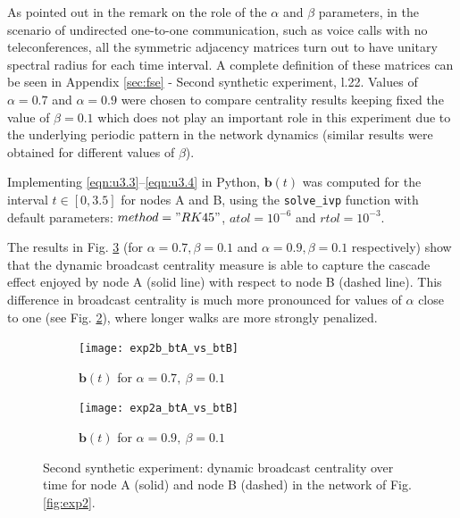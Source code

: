 As pointed out in the remark on the role of the $\alpha$ and $\beta$ parameters, in the scenario of undirected one-to-one communication, such as voice calls with no teleconferences, all the symmetric adjacency matrices turn out to have unitary spectral radius for each time interval. A complete definition of these matrices can be seen in Appendix \ref{sec:fse} - Second synthetic experiment, l.22. Values of $\alpha=0.7$ and $\alpha=0.9$ were chosen to compare centrality results keeping fixed the value of $\beta=0.1$ which does not play an important role in this experiment due to the underlying periodic pattern in the network dynamics (similar results were obtained for different values of $\beta$). 

Implementing \eqref{eqn:u3.3}--\eqref{eqn:u3.4} in Python, $\mathbf{b}(t)$ was computed for the interval $t\in[0,3.5]$ for nodes A and B, using the \texttt{solve\_ivp} function with default parameters: $method="RK45"$, $atol=10^{-6}$ and $rtol=10^{-3}$.

The results in Fig. \ref{fig:twobt} (for $\alpha = 0.7, \beta = 0.1$ and $\alpha = 0.9 , \beta = 0.1$ respectively) show that the dynamic broadcast centrality measure is able to capture the cascade effect enjoyed by node A (solid line) with respect to node B (dashed line). This difference in broadcast centrality is much more pronounced for values of $\alpha$ close to one (see Fig. \ref{fig:bt6}), where longer walks are more strongly penalized. 

\begin{figure}
     \centering
     \begin{subfigure}[b]{0.49\textwidth}
         \centering
         \texttt{[image: exp2b\_btA\_vs\_btB]}
         \caption{$\mathbf{b}(t)$ for $\alpha = 0.7 ,~\beta = 0.1$}
         \label{fig:bt5}
     \end{subfigure}
     \hfill
     \begin{subfigure}[b]{0.49\textwidth}
         \centering
         \texttt{[image: exp2a\_btA\_vs\_btB]}
         \caption{$\mathbf{b}(t)$ for $\alpha = 0.9 ,~\beta = 0.1$}
         \label{fig:bt6}
     \end{subfigure}
     \caption{Second synthetic experiment: dynamic broadcast centrality over time for node A (solid) and node B (dashed) in the network of Fig. \ref{fig:exp2}.}
     \label{fig:twobt}
\end{figure}

